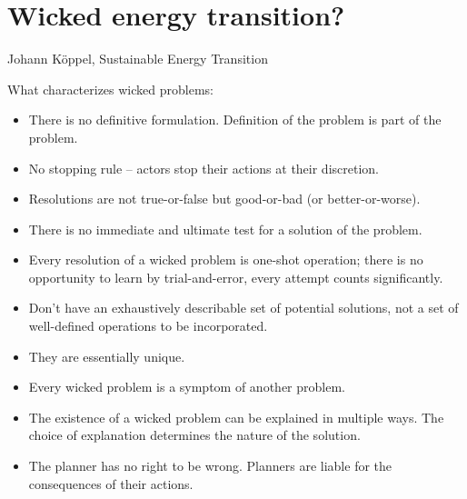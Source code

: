 \section{Wicked energy transition?}
Johann Köppel, Sustainable Energy Transition

What characterizes wicked problems:

\begin{itemize}
	\item There is no definitive formulation. Definition of the problem is
	part of the problem.
	\item No stopping rule -- actors stop their actions at their
	discretion.
	\item Resolutions are not true-or-false but good-or-bad (or
	better-or-worse).
	\item There is no immediate and ultimate test for a solution of the
	problem.
	\item Every resolution of a wicked problem is one-shot operation;
	there is no opportunity to learn by trial-and-error, every attempt
	counts significantly.
	\item Don't have an exhaustively describable set of potential
	solutions, not a set of well-defined operations to be incorporated.
	\item They are essentially unique.
	\item Every wicked problem is a symptom of another problem.
	\item The existence of a wicked problem can be explained in multiple
	ways. The choice of explanation determines the nature of the solution.
	\item The planner has no right to be wrong. Planners are liable for the
	consequences of their actions.
\end{itemize}
